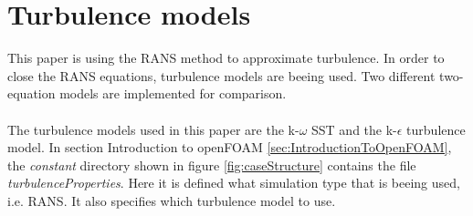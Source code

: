 \documentclass[a4paper, 12pt]{report}
\begin{document}
\section{Turbulence models}
This paper is using the RANS method to approximate turbulence. In order to close the RANS equations, turbulence models are beeing used. Two different two-equation models are implemented for comparison.\\
\\
The turbulence models used in this paper are the k-$\omega$ SST and the k-$\epsilon$ turbulence model. In section Introduction to openFOAM \ref{sec:IntroductionToOpenFOAM}, the \textit{constant} directory shown in figure \ref{fig:caseStructure} contains the file \textit{turbulenceProperties}. Here it is defined what simulation type that is beeing used, i.e. RANS. It also specifies which turbulence model to use.
\end{document}
